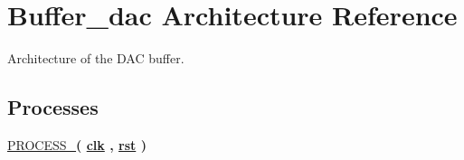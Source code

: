 \hypertarget{classDAC__buffer_1_1Buffer__dac}{\section{Buffer\-\_\-dac Architecture Reference}
\label{classDAC__buffer_1_1Buffer__dac}
}


Architecture of the D\-A\-C buffer.  


\subsection*{Processes}
 \begin{DoxyCompactItemize}
\item 
\hypertarget{classDAC__buffer_1_1Buffer__dac_a59eb74dc65f67582e3c037f7786d7adc}{\hyperlink{classDAC__buffer_1_1Buffer__dac_a59eb74dc65f67582e3c037f7786d7adc}{P\-R\-O\-C\-E\-S\-S\-\_}{\bfseries  ( {\bfseries {\bfseries \hyperlink{classDAC__buffer_a8120037e0ee47c35ba2d79242209c72e}{clk}} \textcolor{vhdlchar}{ }\textcolor{vhdlchar}{ }\textcolor{vhdlchar}{ }} , {\bfseries {\bfseries \hyperlink{classDAC__buffer_aa7b7040844189161771c36cf6bbf172c}{rst}} \textcolor{vhdlchar}{ }} )}}\label{classDAC__buffer_1_1Buffer__dac_a59eb74dc65f67582e3c037f7786d7adc}

\end{DoxyCompactItemize}
